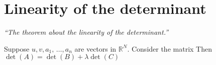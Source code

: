 \documentclass[12pt]{report}
\begin{document}
    \section{Linearity of the determinant}
    \textit{``The theorem about the linearity of the determinant.''} \vspace{3mm}
    \begin{theorem}
        Suppose \(u,v,a_1, \, \dots, a_n\) are vectors in \(\mathbb{R}^N\). Consider the matrix
        \sidebysidebyside{
            \[
                A = 
                \begin{gmatrix}[b]
                    a_1\\
                    \vdots\\
                    a_{r-1}\\
                    u + \lambda v\\
                    a_{r+1}\\
                    \vdots\\
                    a_n
                \end{gmatrix}
            \]
        }{
            \[
                B = 
                \begin{gmatrix}[b]
                    a_1\\
                    \vdots\\
                    a_{r-1}\\
                    u\\
                    a_{r+1}\\
                    \vdots\\
                    a_n
                \end{gmatrix}
            \]
        }{
            \[
                C = 
                \begin{gmatrix}[b]
                    a_1\\
                    \vdots\\
                    a_{r-1}\\
                    v\\
                    a_{r+1}\\
                    \vdots\\
                    a_n
                \end{gmatrix}
            \]
        }
        Then \(\det(A) = \det(B) + \lambda \det(C)\)
    \end{theorem}
\end{document}
